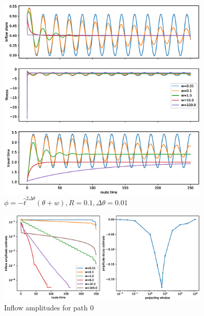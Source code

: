 \documentclass[12pt]{article}
\begin{document}
\begin{figure}
	\includegraphics[width=0.9\textwidth]{img/replicator_proj_tt.eps}
	\caption{ $ \phi = -\hat{t}^{2\Delta \theta}(\theta + w), R=0.1, \Delta \theta = 0.01$}
	\label{fig:fluctuations_proj}

\end{figure}
	
\begin{figure}
	\includegraphics[width=0.9\textwidth]{img/amplitudes_proj_tt.eps}
	\caption{ Inflow amplitudes for path 0 }
	\label{fig:amplitudes_proj}

\end{figure}
\end{document}
